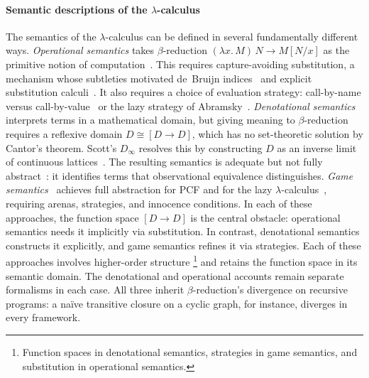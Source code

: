 \paragraph{Semantic descriptions of the $\lambda$-calculus}
The semantics of the $\lambda$-calculus can be defined in
several fundamentally different ways.
\emph{Operational semantics} takes $\beta$-reduction
$(\lambda x.\,M)\,N \to M[N/x]$ as the primitive notion of
computation~\cite{church1936-lambda-calculus,church1941-calculi-of-lambda-conversion,barendregt1984-lambda-calculus}.
This requires capture-avoiding substitution, a mechanism whose
subtleties motivated de~Bruijn
indices~\cite{debruijn1972-nameless-dummies} and explicit substitution
calculi~\cite{abadi1991-explicit-substitutions}.
It also requires a choice of evaluation
strategy: call-by-name versus
call-by-value~\cite{plotkin1975-call-by-name-call-by-value} or the lazy
strategy of Abramsky~\cite{abramsky1990-lazy-lambda-calculus}.
\emph{Denotational semantics}~\cite{scott1970-mathematical-theory-of-computation,scott1976-data-types-as-lattices}
interprets terms in a mathematical domain, but giving meaning
to $\beta$-reduction requires a reflexive domain
$D \cong [D \to D]$, which has no set-theoretic solution by
Cantor's theorem. Scott's $D_\infty$ resolves this by
constructing $D$ as an inverse limit of continuous
lattices~\cite{scott1972-continuous-lattices}.
The resulting semantics is adequate but not fully
abstract~\cite{plotkin1977-lcf-as-programming-language,milner1977-fully-abstract-models}:
it identifies terms that observational equivalence
distinguishes.
\emph{Game semantics}~\cite{abramsky2000-full-abstraction-pcf,hyland2000-full-abstraction-pcf,nickau1994-hereditarily-sequential-functionals}
achieves full abstraction for PCF and for the lazy
$\lambda$-calculus~\cite{abramsky1993-full-abstraction-lazy-lambda,abramsky1995-games-full-abstraction-lazy-lambda},
requiring arenas, strategies, and innocence conditions.
In each of these approaches, the function space $[D \to D]$
is the central obstacle: operational semantics needs it
implicitly via substitution. In contrast, denotational semantics
constructs it explicitly, and game semantics refines it via
strategies.
Each of these approaches involves higher-order structure%
\footnote{
  Function spaces
  in denotational semantics, strategies
  in game semantics, and substitution
  in operational semantics.
}
and retains the function space in its semantic domain.
The denotational and operational accounts remain separate
formalisms in each case.
All three inherit $\beta$-reduction's divergence on
recursive programs: a na\"ive transitive closure on a cyclic
graph, for instance, diverges in every framework.

